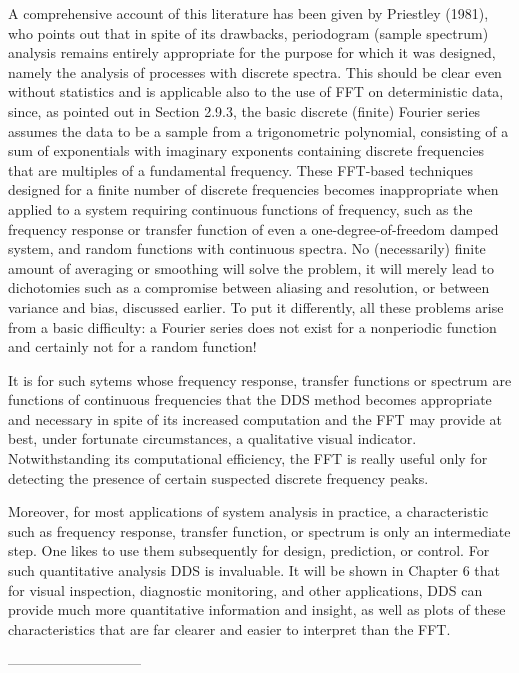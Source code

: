 A comprehensive account of this literature has
been given by Priestley (1981), who points out
that in spite of its drawbacks, periodogram
(sample spectrum) analysis remains entirely
appropriate for the purpose for which it was
designed, namely the analysis of processes with
discrete spectra.  This should be clear even
without statistics and is applicable also to the
use of FFT on deterministic data, since, as
pointed out in Section 2.9.3, the basic discrete
(finite) Fourier series assumes the data to be a
sample from a trigonometric polynomial, consisting
of a sum of exponentials with imaginary exponents
containing discrete frequencies that are multiples
of a fundamental frequency.  These FFT-based
techniques designed for a finite number of
discrete frequencies becomes inappropriate when
applied to a system requiring continuous functions
of frequency, such as the frequency response or
transfer function of even a one-degree-of-freedom
damped system, and random functions with
continuous spectra.  No (necessarily) finite
amount of averaging or smoothing will solve the
problem, it will merely lead to dichotomies such
as a compromise between aliasing and resolution,
or between variance and bias, discussed earlier.
To put it differently, all these problems arise
from a basic difficulty: a Fourier series does not
exist for a nonperiodic function and certainly not
for a random function!
 
It is for such sytems whose frequency response,
transfer functions or spectrum are functions of
continuous frequencies that the DDS method becomes
appropriate and necessary in spite of its
increased computation and the FFT may provide at
best, under fortunate circumstances, a qualitative
visual indicator.  Notwithstanding its
computational efficiency, the FFT is really useful
only for detecting the presence of certain
suspected discrete frequency peaks.
 
Moreover, for most applications of system analysis
in practice, a characteristic such as frequency
response, transfer function, or spectrum is only
an intermediate step.  One likes to use them
subsequently for design, prediction, or control.
For such quantitative analysis DDS is invaluable.
It will be shown in Chapter 6 that for visual
inspection, diagnostic monitoring, and other
applications, DDS can provide much more
quantitative information and insight, as well as
plots of these characteristics that are far
clearer and easier to interpret than the FFT.
 
-----------------------------
 
